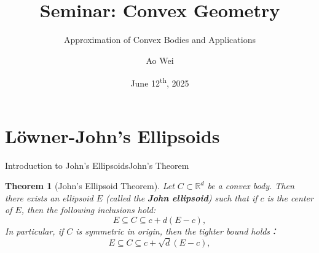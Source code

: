 \documentclass[
  english,            %
  aspectratio=169,    %
]{tumbeamer}
\title{Seminar: Convex Geometry}
\subtitle{Approximation of Convex Bodies and Applications}
\author{Ao Wei}
\institute{\theDepartmentName\\\theUniversityName}
\date[12/06/2025]{June 12\textsuperscript{th}, 2025}
\newtheorem{theorem}{Theorem}
\begin{document}
\maketitle

\section{Löwner-John's Ellipsoids}

\begin{frame}{Introduction to John's Ellipsoids}{John's Theorem}
    \begin{center}
    \begin{theorem}[John's Ellipsoid Theorem]
      Let $C \subset\mathbb{R}^d$ be a convex body. Then there exists an ellipsoid $E$ (called the \textbf{John ellipsoid}) such that if $c$ is the center of $E$, then the following inclusions hold:
    \[
    E \subseteq C \subseteq c + d(E - c),
    \]
    In particular, if $C$ is symmetric in origin, then the tighter bound holds：
    \[
    E \subseteq C \subseteq c + \sqrt{d}(E - c),
    \]
    \end{theorem}
  \end{center}
\end{frame}
\end{document}
